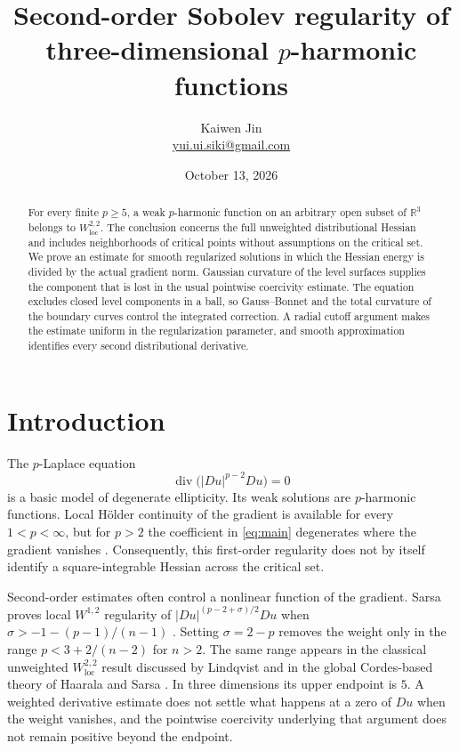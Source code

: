 \documentclass[11pt]{article}
\title{Second-order Sobolev regularity of three-dimensional
  \texorpdfstring{$p$}{p}-harmonic functions}
\author{Kaiwen Jin\\
  \small\href{mailto:yui.ui.siki@gmail.com}{yui.ui.siki@gmail.com}}
\date{October 13, 2026}
\theoremstyle{remark}
\newcommand{\R}{\mathbb R}
\newcommand{\loc}{\mathrm{loc}}
\newcommand{\diver}{\operatorname{div}}
\begin{document}
\maketitle

\begin{abstract}
For every finite $p\geq5$, a weak $p$-harmonic function on an arbitrary
open subset of $\R^3$ belongs to $W^{2,2}_{\loc}$. The conclusion concerns
the full unweighted distributional Hessian and includes neighborhoods
of critical points without assumptions on the critical set.
We prove an estimate for smooth regularized solutions in which the
Hessian energy is divided by the actual gradient norm. Gaussian
curvature of the level surfaces supplies the component that is lost
in the usual pointwise coercivity estimate. The equation excludes
closed level components in a ball, so Gauss--Bonnet and the total
curvature of the boundary curves control the integrated correction.
A radial cutoff argument makes the estimate uniform in the
regularization parameter, and smooth approximation identifies every
second distributional derivative.
\end{abstract}

\section{Introduction}

The $p$-Laplace equation
\begin{equation}\label{eq:main}
 \diver\bigl(|Du|^{p-2}Du\bigr)=0
\end{equation}
is a basic model of degenerate ellipticity. Its weak solutions are
$p$-harmonic functions. Local H\"older continuity of the gradient is
available for every $1<p<\infty$, but for $p>2$ the coefficient in
\eqref{eq:main} degenerates where the gradient vanishes
\cite[Section 4]{Lindqvist}. Consequently, this first-order regularity
does not by itself identify a square-integrable Hessian across the
critical set.

Second-order estimates often control a nonlinear function of the
gradient. Sarsa proves local $W^{1,2}$ regularity of
$|Du|^{(p-2+\sigma)/2}Du$ when
$\sigma>-1-(p-1)/(n-1)$ \cite[Theorem 1.1]{Sarsa}.
Setting $\sigma=2-p$ removes the weight only in the range
$p<3+2/(n-2)$ for $n>2$. The same range appears in the classical
unweighted $W^{2,2}_{\loc}$ result discussed by Lindqvist
\cite[Section 11, p.~93, Second Derivatives]{Lindqvist} and in the global
Cordes-based theory of Haarala and Sarsa \cite{HaaralaSarsa}.
In three dimensions its upper endpoint is $5$. A weighted derivative
estimate does not settle what happens at a zero of $Du$ when the
weight vanishes, and the pointwise coercivity underlying that
argument does not remain positive beyond the endpoint.
\end{document}
